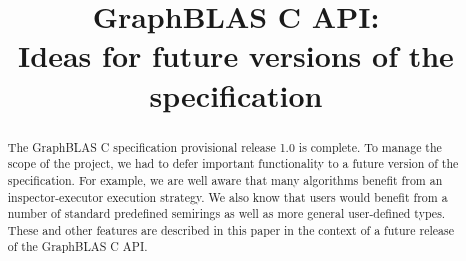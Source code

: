 \documentclass[conference]{IEEEtran}
\begin{document}
\pagestyle{plain}

\title{GraphBLAS C API: \\ Ideas for future versions of the specification}

%
%
\author{
%
       \vspace{1ex}
}
\maketitle
\thispagestyle{plain}
\begin{abstract}
The GraphBLAS C specification provisional release 1.0 is complete. To
manage the scope of the project, we had to defer important functionality
to a future version of the specification.  For example, we are well
aware that many algorithms benefit from an inspector-executor execution
strategy.  We also know that users would benefit from a number of standard
predefined semirings as well as more general user-defined types. These
and other features are described in this paper in the context of a future
release of the GraphBLAS C API.
\end{abstract}



\label{sec:stddefs}

\label{sec:inspecExec}

\label{sec:dag}

\label{sec:masks}

\label{sec:usrTypes}

\label{sec:kronProd}

\label{sec:promotion}

\newpage



\end{document}
